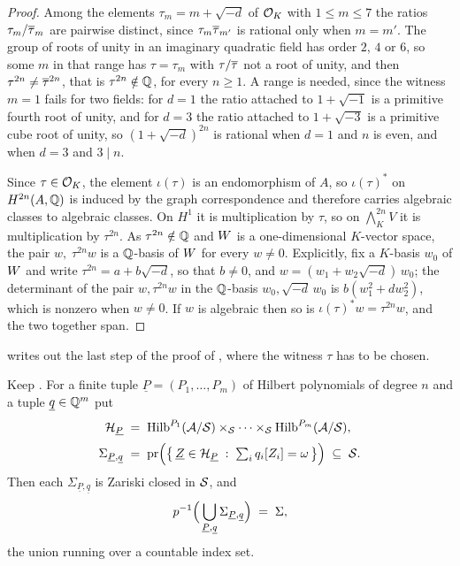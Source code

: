 \begin{proof}
Among the elements $\tau_{m}=m+\sqrt{-d}$ of $\mathcal{O}_{K}$ with $1\le m\le7$ the
ratios $\tau_{m}/\overline{\tau}_{m}$ are pairwise distinct, since
$\tau_{m}\overline{\tau}_{m'}$ is rational only when $m=m'$. The group of roots of
unity in an imaginary quadratic field has order $2$, $4$ or $6$, so some $m$
in that range has $\tau=\tau_{m}$ with $\tau/\overline{\tau}$ not a root of unity,
and then $\tau^{2n}\ne\overline{\tau}^{2n}$, that is $\tau^{2n}\notin\mathbb{Q}$, for
every $n\ge1$. A range is needed, since the witness $m=1$ fails for two
fields: for $d=1$ the ratio attached to $1+\sqrt{-1}$ is a primitive fourth
root of unity, and for $d=3$ the ratio attached to $1+\sqrt{-3}$ is a
primitive cube root of unity, so $(1+\sqrt{-d})^{2n}$ is rational when $d=1$
and $n$ is even, and when $d=3$ and $3\mid n$.

Since $\tau\in\mathcal{O}_{K}$, the element $\iota(\tau)$ is an endomorphism of $A$,
so $\iota(\tau)^{*}$ on $H^{2n}(A,\mathbb{Q})$ is induced by the graph
correspondence and therefore carries algebraic classes to algebraic classes.
On $H^{1}$ it is multiplication by $\tau$, so on
$\bigwedge^{2n}_{K}V$ it is multiplication by $\tau^{2n}$. As
$\tau^{2n}\notin\mathbb{Q}$ and $W$ is a one-dimensional $K$-vector space, the pair
$w,\;\tau^{2n}w$ is a $\mathbb{Q}$-basis of $W$ for every $w\ne0$. Explicitly, fix
a $K$-basis $w_{0}$ of $W$ and write $\tau^{2n}=a+b\sqrt{-d}$, so that
$b\ne0$, and $w=(w_{1}+w_{2}\sqrt{-d})\,w_{0}$; the determinant of the pair
$w,\tau^{2n}w$ in the $\mathbb{Q}$-basis $w_{0},\sqrt{-d}\,w_{0}$ is
$b(w_{1}^{2}+dw_{2}^{2})$, which is nonzero when $w\ne0$. If $w$ is
algebraic then so is $\iota(\tau)^{*}w=\tau^{2n}w$, and the two together span.
\end{proof}

 writes out the last step of the proof of
, where the witness $\tau$ has to be chosen.

\begin{theorem}\label{thm:closedlocus}
Keep . For a finite tuple $\underline{P}=(P_{1},\dots
,P_{m})$ of Hilbert polynomials of degree $n$ and a tuple
$\underline{q}\in\mathbb{Q}^{m}$ put
\begin{align*}
  \mathcal{H}_{\underline{P}}
  &\;=\;
  \operatorname{Hilb}^{P_{1}}(\mathcal{A}/\mathcal{S})\times_{\mathcal{S}}\cdots\times_{\mathcal{S}}\operatorname{Hilb}^{P_{m}}(\mathcal{A}/\mathcal{S}),
  \\[2pt]
  \Sigma_{\underline{P},\underline{q}}
  &\;=\;
  \mathrm{pr}\Bigl(\bigl\{\,\underline{Z}\in\mathcal{H}_{\underline{P}}
    \;:\;\textstyle\sum_{i}q_{i}[Z_{i}]=\omega\,\bigr\}\Bigr)
  \;\subseteq\;\mathcal{S} .
\end{align*}
Then each $\Sigma_{\underline{P},\underline{q}}$ is Zariski closed in
$\mathcal{S}$, and
\[
  p^{-1}\Bigl(\,\bigcup_{\underline{P},\underline{q}}
    \Sigma_{\underline{P},\underline{q}}\Bigr)\;=\;\Sigma ,
\]
the union running over a countable index set.
\end{theorem}

